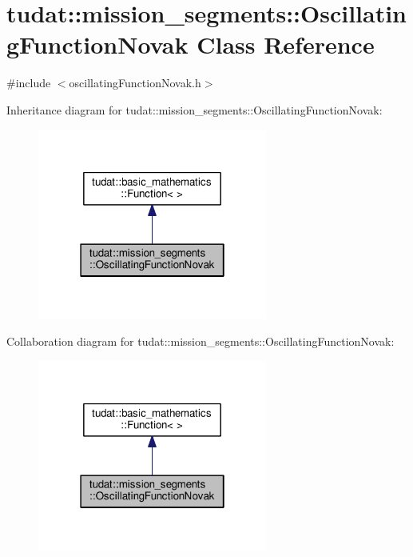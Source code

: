 \hypertarget{classtudat_1_1mission__segments_1_1OscillatingFunctionNovak}{}\section{tudat\+:\+:mission\+\_\+segments\+:\+:Oscillating\+Function\+Novak Class Reference}
\label{classtudat_1_1mission__segments_1_1OscillatingFunctionNovak}


{\ttfamily \#include $<$oscillating\+Function\+Novak.\+h$>$}



Inheritance diagram for tudat\+:\+:mission\+\_\+segments\+:\+:Oscillating\+Function\+Novak\+:
\nopagebreak
\begin{figure}[H]
\begin{center}
\leavevmode
\includegraphics[width=214pt]{classtudat_1_1mission__segments_1_1OscillatingFunctionNovak__inherit__graph}
\end{center}
\end{figure}


Collaboration diagram for tudat\+:\+:mission\+\_\+segments\+:\+:Oscillating\+Function\+Novak\+:
\nopagebreak
\begin{figure}[H]
\begin{center}
\leavevmode
\includegraphics[width=214pt]{classtudat_1_1mission__segments_1_1OscillatingFunctionNovak__coll__graph}
\end{center}
\end{figure}
